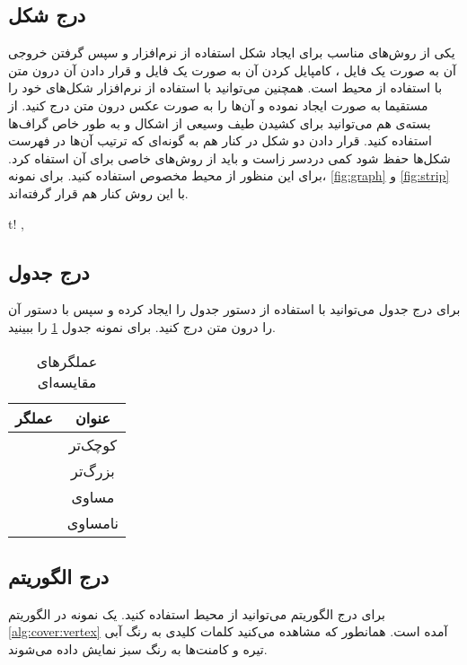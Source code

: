 \subsection{درج شکل}
یکی از روش‌های مناسب برای ایجاد شکل استفاده از نرم‌افزار  و سپس گرفتن خروجی آن به صورت یک فایل ، کامپایل کردن آن به صورت یک فایل    و قرار دادن آن درون متن با استفاده از محیط   است. همچنین می‌توانید با استفاده از نرم‌افزار  شکل‌های خود را مستقیما به صورت  ایجاد نموده و آن‌ها را به صورت عکس درون متن درج کنید. از بسته‌ی  هم می‌توانید برای کشیدن طیف وسیعی از اشکال و به طور خاص گراف‌ها استفاده کنید. قرار دادن دو شکل در کنار هم به گونه‌ای که ترتیب آن‌ها در فهرست شکل‌ها حفظ شود کمی دردسر زاست و باید از روش‌های خاصی برای آن استفاه کرد. برای این منظور از محیط مخصوص  استفاده کنید. برای نمونه، \cref{fig:graph} و \cref{fig:strip} با این روش کنار هم قرار گرفته‌اند.
\begin{rowfig}{t!}
\sep
{}
\end{rowfig}				   
					   

\subsection{درج جدول}
برای درج جدول می‌توانید با استفاده از دستور  جدول را ایجاد کرده و سپس با دستور    آن را درون متن درج کنید. برای نمونه جدول \ref{tbl:operators} را ببینید.
\begin{table}[b!]
\centering
\caption{عملگرهای مقایسه‌ای}
\label{tbl:operators}
\begin{tabular}{|c|c|}
\hline
\textbf{عملگر} & \textbf{عنوان} \\ 
\hline \hline
\code{<} & کوچک‌تر \\ 
\code{>} & بزرگ‌تر \\
\code{==} & مساوی \\ 
\code{<>} & نامساوی \\ 
\hline
\end{tabular}
\end{table}


\subsection{درج الگوریتم}
برای درج الگوریتم می‌توانید از محیط  استفاده کنید. یک نمونه در الگوریتم \ref{alg:cover:vertex} آمده است. همانطور که مشاهده می‌کنید کلمات کلیدی به رنگ آبی تیره و کامنت‌ها به رنگ سبز نمایش داده می‌شوند.

